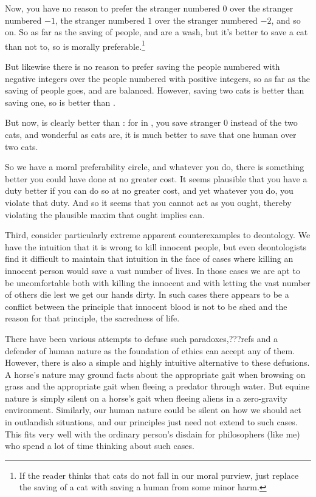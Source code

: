 Now, you have no reason to prefer
the stranger numbered $0$ over the stranger numbered $-1$, the stranger numbered $1$ over the
stranger numbered $-2$, and so on. So as far as the saving of people,  and 
are a wash, but it's better to save a cat than not to, so  is morally preferable.\footnote{If the
reader thinks that cats do not fall in our moral purview, just replace the saving of a cat with saving a human
from some minor harm.}

But likewise there is no reason to prefer saving the people numbered with negative integers over the
people numbered with positive integers, so as far as the saving of people goes,  and
 are balanced. However, saving two cats is better than saving one, so 
is better than . 

But now,  is clearly better than : for in , you save stranger
$0$ instead of the two cats, and wonderful as cats are, it is much better to save that one human over two cats. 

So we have a moral preferability circle, and whatever you do, there is something better you could have
done at no greater cost. It seems plausible that you have a duty better if you can do so at no greater
cost, and yet whatever you do, you violate that duty. And so it seems that you cannot act as you ought,
thereby violating the plausible maxim that ought implies can.

Third, consider particularly extreme apparent counterexamples to deontology. We have the intuition that
it is wrong to kill innocent people, but even deontologists find it difficult to maintain that intuition
in the face of cases where killing an innocent person would save a vast number of lives. In those cases
we are apt to be uncomfortable  both with killing the innocent and with letting the vast number of others
die lest we get our hands dirty. In such cases there appears to be a conflict between the principle 
that innocent blood is not to be shed and the reason for that principle, the sacredness of life. 

There have been various attempts to defuse such paradoxes,???refs and a defender of human nature as the
foundation of ethics can accept any of them. However, there is also a simple and highly intuitive 
alternative to these defusions. A horse's nature may ground facts about the appropriate gait when
browsing on grass and the appropriate gait when fleeing a predator through water. But equine nature
is simply silent on a horse's gait when fleeing aliens in a zero-gravity environment. Similarly,
our human nature could be silent on how we should act in outlandish situations, and our
principles just need not extend to such cases. This fits very well with the ordinary person's
disdain for philosophers (like me) who spend a lot of time thinking about such cases. 

